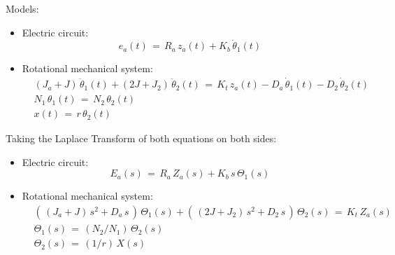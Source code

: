 \documentclass[ 10pt, xcolor = dvipsnames]{beamer}
\begin{document}
\begin{frame}[allowframebreaks]
\frametitle{\insertsection}

Models: 
\begin{itemize}
\item Electric circuit:
\[
e_a(t) \, = \, R_a \, z_a(t) + K_b \, \dot{\theta}_1(t)
\]
\item Rotational mechanical system:
\begin{align*}
& ( J_a + J ) \, \ddot{\theta}_1(t) + ( 2J + J_2 ) \, \ddot{\theta}_2(t) 
\, = \, K_t \, z_a(t) - D_a \, \dot{\theta}_1(t) - D_2 \, \dot{\theta}_2(t) \\[1ex]
& N_1 \, \theta_1(t) \, = \, N_2 \, \theta_2(t) \\[1ex]
& x(t) \, = \, r \, \theta_2(t)
\end{align*}
\end{itemize}
\framebreak

Taking the Laplace Transform of both equations on both sides: 
\begin{itemize}
\item Electric circuit:
\[
E_a(s) \, = \, R_a \, Z_a(s) + K_b \, s \, \Theta_1(s)
\]
\item Rotational mechanical system:
\begin{align*}
& ( \, ( J_a + J ) \, s^2 + D_a \, s \, ) \, \Theta_1(s) + 
( \, ( 2J + J_2 ) \, s^2 + D_2 \, s \, ) \, \Theta_2(s) 
\, = \, K_t \, Z_a(s) \\[1ex]
& \Theta_1(s) \, = \, ( N_2/N_1 ) \, \Theta_2(s) \\[1ex]
& \Theta_2(s) \, = \, (1/r) \, X(s)
\end{align*}
\end{itemize}
\framebreak


\end{frame}
\end{document}
